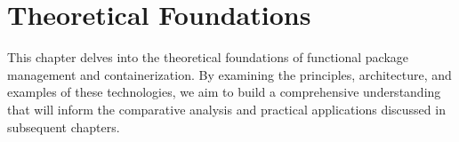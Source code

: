 \chapter{Theoretical Foundations}

This chapter delves into the theoretical foundations of 
functional package management and containerization.
By examining the principles, architecture, and examples of these technologies,
we aim to build a comprehensive understanding that will inform the comparative analysis
and practical applications discussed in subsequent chapters.



